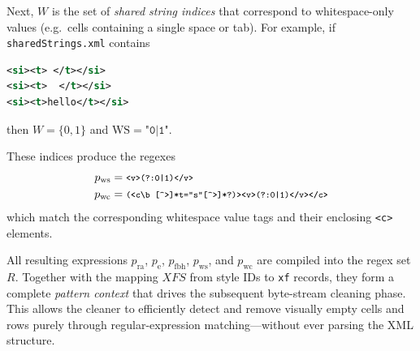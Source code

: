 \documentclass[conference]{IEEEtran}
\newcommand{\codeline}[1]{\text{\ttfamily\footnotesize\detokenize{#1}}}
\begin{document}
Next, \(W\) is the set of \emph{shared string indices} that correspond to
whitespace-only values (e.g.\ cells containing a single space or tab).
For example, if \texttt{sharedStrings.xml} contains
\begin{lstlisting}[language=XML,basicstyle=\ttfamily\scriptsize,frame=none]
<si><t> </t></si>
<si><t>  </t></si>
<si><t>hello</t></si>
\end{lstlisting}
then \(W=\{0,1\}\) and
\(\mathrm{WS}=\texttt{"0|1"}\).

These indices produce the regexes
\[
\begin{aligned}
p_{\text{ws}} &= \codeline{<v>(?:0|1)</v>}\\
p_{\text{wc}} &= \codeline{(<c\b[^>]*t="s"[^>]*?)><v>(?:0|1)</v></c>}
\end{aligned}
\]
which match the corresponding whitespace value tags and their enclosing
\texttt{<c>} elements.

All resulting expressions \(p_{\text{ra}}\), \(p_{\text{e}}\),
\(p_{\text{fbh}}\), \(p_{\text{ws}}\), and \(p_{\text{wc}}\)
are compiled into the regex set \(R\).
Together with the mapping $XFS$ from style IDs to \texttt{xf} records,
they form a complete \emph{pattern context} that drives the subsequent
byte-stream cleaning phase.
This allows the cleaner to efficiently detect and remove visually empty cells
and rows purely through regular-expression matching—without ever parsing
the XML structure.
\end{document}
